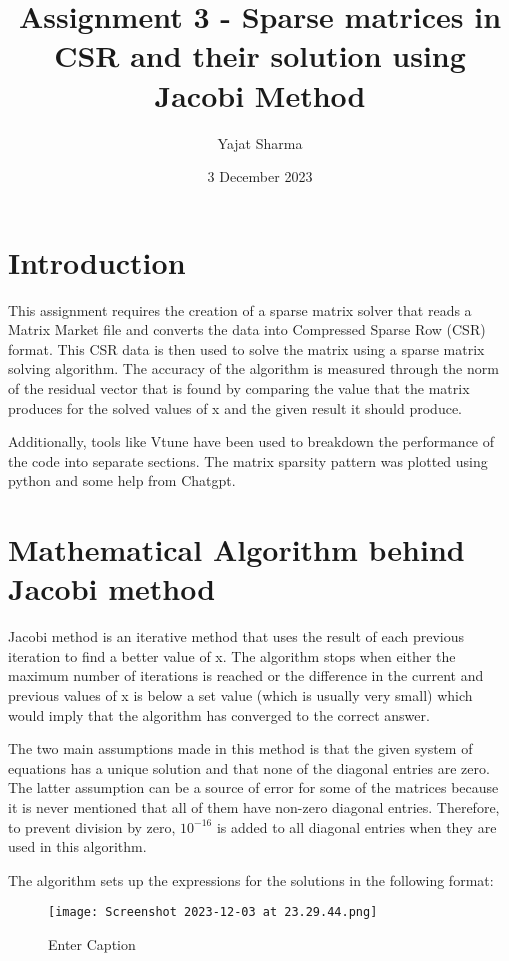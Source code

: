 \documentclass[12pt]{article}
\title{Assignment 3 - Sparse matrices in CSR and their solution using Jacobi Method}
\author{Yajat Sharma}
\date{3 December 2023}
\begin{document}
\maketitle

\section{Introduction}
This assignment requires the creation of a sparse matrix solver that reads a Matrix Market file and converts the data into Compressed Sparse Row (CSR) format. This CSR data is then used to solve the matrix using a sparse matrix solving algorithm. The accuracy of the algorithm is measured through the norm of the residual vector that is found by comparing the value that the matrix produces for the solved values of x and the given result it should produce. 

Additionally, tools like Vtune have been used to breakdown the performance of the code into separate sections. The matrix sparsity pattern was plotted using python and some help from Chatgpt. 

\section{Mathematical Algorithm behind Jacobi method}
Jacobi method is an iterative method that uses the result of each previous iteration to find a better value of x. The algorithm stops when either the maximum number of iterations is reached or the difference in the current and previous values of x is below a set value (which is usually very small) which would imply that the algorithm has converged to the correct answer. 

The two main assumptions made in this method is that the given system of equations has a unique solution and that none of the diagonal entries are zero. The latter assumption can be a source of error for some of the matrices because it is never mentioned that all of them have non-zero diagonal entries. Therefore, to prevent division by zero, $10^{-16}$ is added to all diagonal entries when they are used in this algorithm. 

The algorithm sets up the expressions for the solutions in the following format:
\begin{figure}
    \centering
    \texttt{[image: Screenshot 2023-12-03 at 23.29.44.png]}
    \caption{Enter Caption}
    \label{fig:enter-label}
\end{figure}
\end{document}
